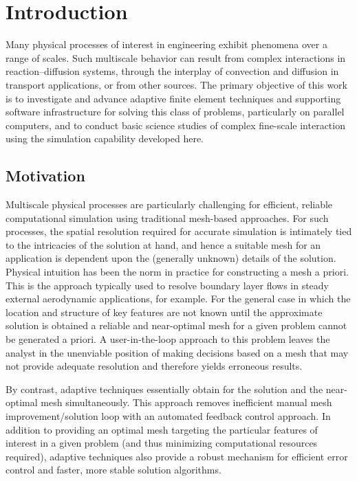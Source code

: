 \chapter{Introduction\label{chap:intro}}

Many physical processes of interest in engineering exhibit phenomena over a range of scales.  Such multiscale behavior can result from complex interactions in reaction--diffusion systems, through the interplay of convection and diffusion in transport applications, or from other sources.  The primary objective of this work is to investigate and advance adaptive finite element techniques and supporting software infrastructure for  solving this class of problems, particularly on parallel computers, and to conduct basic science studies of complex fine-scale interaction using the simulation capability developed here.

\section{Motivation}
Multiscale physical processes are particularly challenging for efficient, reliable  computational simulation using traditional mesh-based approaches.  For such processes, the spatial resolution required for accurate simulation is intimately tied to the intricacies of the solution at hand, and hence a suitable mesh for an application is dependent upon the (generally unknown) details of the solution.  Physical intuition has been the norm in practice for constructing a mesh a priori.  This is the approach typically used to resolve boundary layer flows in steady external aerodynamic applications, for example.  For the general case in which the location and structure of key features are not known until the approximate solution is obtained a reliable and near-optimal mesh for a given problem cannot be generated a priori.  A user-in-the-loop approach to this problem leaves the analyst in the unenviable position of making decisions based on a mesh that may not provide adequate resolution and therefore yields erroneous results.

By contrast, adaptive techniques essentially obtain for the solution and the near-optimal mesh simultaneously.  This approach removes inefficient manual mesh improvement/solution loop with an automated feedback control approach.  In addition to providing an optimal mesh targeting the particular features of interest in a given problem (and thus minimizing computational resources required), adaptive techniques also provide a robust mechanism for efficient error control and faster, more stable solution algorithms.

